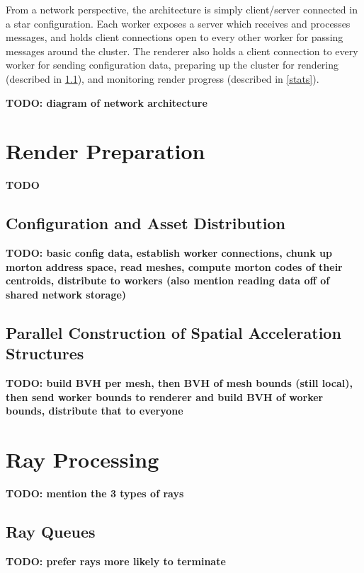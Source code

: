 \documentclass[12pt]{ucthesis}
\begin{document}
From a network perspective, the architecture is simply client/server connected
in a star configuration. Each worker exposes a server which receives and
processes messages, and holds client connections open to every other worker for
passing messages around the cluster. The renderer also holds a client connection
to every worker for sending configuration data, preparing up the cluster for rendering
(described in \ref{sync}), and monitoring render progress (described in \ref{stats}).

\textbf{TODO: diagram of network architecture}

\section{Render Preparation}
\label{prep}

\textbf{TODO}

\subsection{Configuration and Asset Distribution}
\label{sync}

\textbf{TODO: basic config data, establish worker connections, chunk up morton address space, read meshes, compute morton codes of their centroids, distribute to workers (also mention reading data off of shared network storage)}

\subsection{Parallel Construction of Spatial Acceleration Structures}
\label{parallelbvh}

\textbf{TODO: build BVH per mesh, then BVH of mesh bounds (still local), then send worker bounds to renderer and build BVH of worker bounds, distribute that to everyone}

\section{Ray Processing}
\label{process}

\textbf{TODO: mention the 3 types of rays}

\subsection {Ray Queues}
\label{queues}

\textbf{TODO: prefer rays more likely to terminate}
\end{document}
